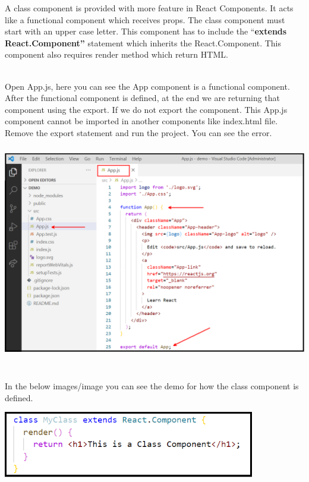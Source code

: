 \documentclass{article}
\begin{document}
\noindent
 A class component is provided with more feature in React Components. It acts like a functional component which receives props. The class component must start with an upper case letter. This component has to include the ``\textbf{extends React.Component''} statement which inherits the React.Component. This component also requires render method which return HTML. 

\noindent 

\noindent\\
 Open App.js, here you can see the App component is a functional component. After the functional component is defined, at the end we are returning that component using the export. If we do not export the component. This App.js component cannot be imported in another components like index.html file. Remove the export statement and run the project. You can see the error.

\noindent 

\begin{center}
	\noindent \includegraphics*[width=5.57in, height=3.69in]{IMG-07-10}
\end{center}

\noindent 

\noindent 

\noindent\\
 In the below images/image you can see the demo for how the class component is defined.

\noindent 

\begin{center}
	\noindent \includegraphics*[width=4.33in, height=1.15in]{IMG-07-11}
\end{center}
\end{document}
